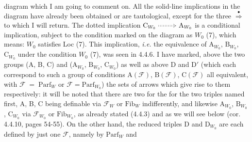 \documentclass[11pt]{article}
\newcommand{\msp}[1]{\marginpar{\footnotesize [#1]}}
\newcommand{\cF}{\mathcal{F}}
\newcommand{\Fib}{\mathrm{Fib}}
\newcommand{\Parf}{\mathrm{Parf}}
\newcommand{\dottedimplies}{\mathrel{\tikz[baseline=-0.6ex]{\draw[dotted, double, double distance=1.5pt, -{Implies}] (0,0) -- (0.9,0);}}}
\begin{document}
diagram which I am going to comment on. All the solid-line implications in the diagram have already been obtained or are tautological, except for the three $\overset{\bullet}{\Longrightarrow}$ to which I will return. The dotted implication $\mathrm{C}_{W_0} \dottedimplies \mathrm{A}_{W_0}$ is a conditional implication, subject to the condition marked on the diagram as $W_0$ (7), which means: $W_0$ satisfies Loc (7). This implication, \textit{i.e.} the equivalence of $\mathrm{A}_{W_0}$, $\mathrm{B}_{W_0}$, $\mathrm{C}_{W_0}$ under the condition $W_0$ (7), was seen in 4.4.6. I have marked, above the two groups (A, B, C) and ($\mathrm{A}_{W_0}$, $\mathrm{B}_{W_0}$, $\mathrm{C}_{W_0}$) as well as above D and D$'$ (which each correspond to such a group of conditions $\mathrm{A}(\cF)$, $\mathrm{B}(\cF)$, $\mathrm{C}(\cF)$ all equivalent, with $\cF \;=\; \Parf_W$ or $\cF = \Parf_{W_0}$) the
\msp{page 49}
sets of arrows which give rise to them respectively: it will be noted that there are two for the for the two triples named first, A, B, C being definable via $\cF_W$ or $\Fib_W$ indifferently, and likewise $\mathrm{A}_{W_0}$, $\mathrm{B}_{W_0}$, $\mathrm{C}_{W_0}$ via $\cF_{W_0}$ or $\Fib_{W_0}$, as already stated (4.4.3) and as we will see below (cor. 4.4.10, pages 54-55). On the other hand, the reduced triples D and $\mathrm{D}_{W_0}$ are each defined by just one $\cF$, namely by $\Parf_W$ and %
\end{document}
